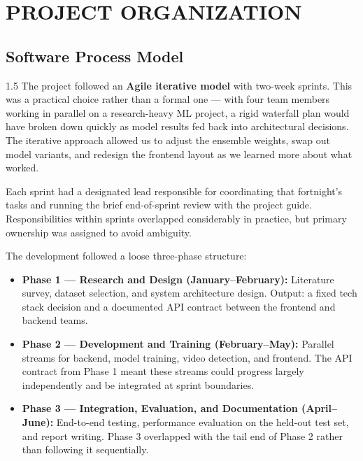 \chapter{PROJECT ORGANIZATION}

\section{Software Process Model}

\begin{spacing}{1.5}
The project followed an \textbf{Agile iterative model} with two-week sprints. This was a practical choice rather than a formal one --- with four team members working in parallel on a research-heavy ML project, a rigid waterfall plan would have broken down quickly as model results fed back into architectural decisions. The iterative approach allowed us to adjust the ensemble weights, swap out model variants, and redesign the frontend layout as we learned more about what worked.

Each sprint had a designated lead responsible for coordinating that fortnight's tasks and running the brief end-of-sprint review with the project guide. Responsibilities within sprints overlapped considerably in practice, but primary ownership was assigned to avoid ambiguity.

The development followed a loose three-phase structure:
\begin{itemize}
  \item \textbf{Phase 1 --- Research and Design (January--February):} Literature survey, dataset selection, and system architecture design. Output: a fixed tech stack decision and a documented API contract between the frontend and backend teams.
  \item \textbf{Phase 2 --- Development and Training (February--May):} Parallel streams for backend, model training, video detection, and frontend. The API contract from Phase 1 meant these streams could progress largely independently and be integrated at sprint boundaries.
  \item \textbf{Phase 3 --- Integration, Evaluation, and Documentation (April--June):} End-to-end testing, performance evaluation on the held-out test set, and report writing. Phase 3 overlapped with the tail end of Phase 2 rather than following it sequentially.
\end{itemize}
\end{spacing}


